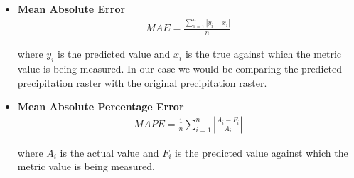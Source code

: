 \begin{itemize}
    \item \textbf{Mean Absolute Error}\\
          \begin{gather*}
              MAE = \frac{\sum_{1 = 1}^{n}\left\lvert
                  y_i - x_i
                  \right\rvert}{n}
          \end{gather*}

          where $y_i$ is the predicted value and $x_i$ is the true against which the metric value is being measured. In our case we would be comparing the predicted precipitation raster with the original precipitation raster.
    \item \textbf{Mean Absolute Percentage Error}\\
          \begin{gather*}
              MAPE = \frac{1}{n} \sum_{i=1}^{n}
              \left\lvert
              \frac{A_i - F_i }{A_i}
              \right\rvert
          \end{gather*}

          where $A_i$ is the actual value and $F_i$ is the predicted value against which the metric value is being measured.
\end{itemize}